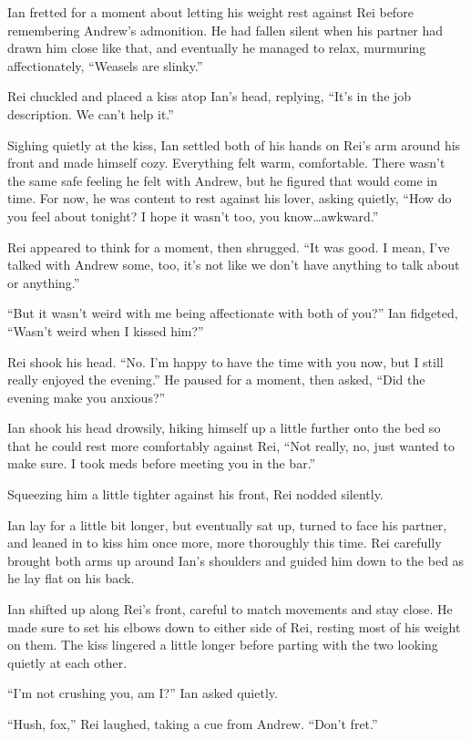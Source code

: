 Ian fretted for a moment about letting his weight rest against Rei before remembering Andrew's admonition. He had fallen silent when his partner had drawn him close like that, and eventually he managed to relax, murmuring affectionately, ``Weasels are slinky.''

Rei chuckled and placed a kiss atop Ian's head, replying, ``It's in the job description. We can't help it.''

Sighing quietly at the kiss, Ian settled both of his hands on Rei's arm around his front and made himself cozy. Everything felt warm, comfortable. There wasn't the same safe feeling he felt with Andrew, but he figured that would come in time.  For now, he was content to rest against his lover, asking quietly, ``How do you feel about tonight? I hope it wasn't too, you know\ldots{}awkward.''

Rei appeared to think for a moment, then shrugged. ``It was good. I mean, I've talked with Andrew some, too, it's not like we don't have anything to talk about or anything.''

``But it wasn't weird with me being affectionate with both of you?'' Ian fidgeted, ``Wasn't weird when I kissed him?''

Rei shook his head. ``No. I'm happy to have the time with you now, but I still really enjoyed the evening.'' He paused for a moment, then asked, ``Did the evening make you anxious?''

Ian shook his head drowsily, hiking himself up a little further onto the bed so that he could rest more comfortably against Rei, ``Not really, no, just wanted to make sure. I took meds before meeting you in the bar.''

Squeezing him a little tighter against his front, Rei nodded silently.

Ian lay for a little bit longer, but eventually sat up, turned to face his partner, and leaned in to kiss him once more, more thoroughly this time. Rei carefully brought both arms up around Ian's shoulders and guided him down to the bed as he lay flat on his back.

Ian shifted up along Rei's front, careful to match movements and stay close. He made sure to set his elbows down to either side of Rei, resting most of his weight on them. The kiss lingered a little longer before parting with the two looking quietly at each other.

``I'm not crushing you, am I?'' Ian asked quietly.

``Hush, fox,'' Rei laughed, taking a cue from Andrew. ``Don't fret.''

